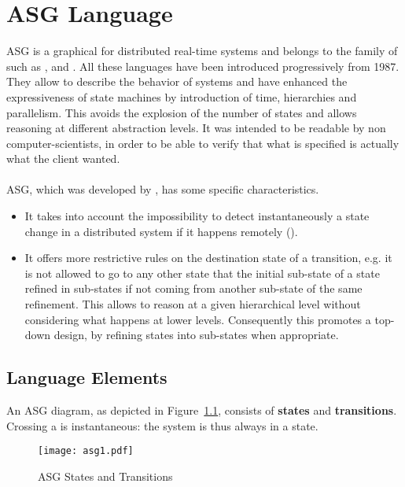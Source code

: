 \documentclass[../main.tex]{subfiles}
\begin{document}
\chapter{ASG Language}
ASG is a graphical  for distributed real-time systems and belongs to the family of  such as ,  and .
All these languages have been introduced progressively from 1987.
They allow to describe the behavior of systems and have enhanced the expressiveness of state machines by introduction of time, hierarchies and parallelism.
This avoids the explosion of the number of states and allows reasoning at different abstraction levels.
It was intended to be readable by non computer-scientists, in order to be able to verify that what is specified is actually what the client wanted.
\\\\
ASG, which was developed by , has some specific characteristics.
\begin{itemize}
	\item It takes into account the impossibility to detect instantaneously a state change in a distributed system if it happens remotely ().
	\item It offers more restrictive rules on the destination state of a transition, e.g. it is not allowed to go to any other state that the initial sub-state of a state refined in sub-states if not coming from another sub-state of the same refinement.
    This allows to reason at a given hierarchical level without considering what happens at lower levels.
    Consequently this promotes a top-down design, by refining states into sub-states when appropriate.
\end{itemize}

\section{Language Elements}
An ASG diagram, as depicted in Figure~\ref{asg1}, consists of \textbf{states} and \textbf{transitions}. Crossing a  is instantaneous: the system is thus always in a state.
\begin{figure}[H]
    \centering
    \texttt{[image: asg1.pdf]}
    \caption{ASG States and Transitions}
    \label{asg1}
\end{figure}
\end{document}
